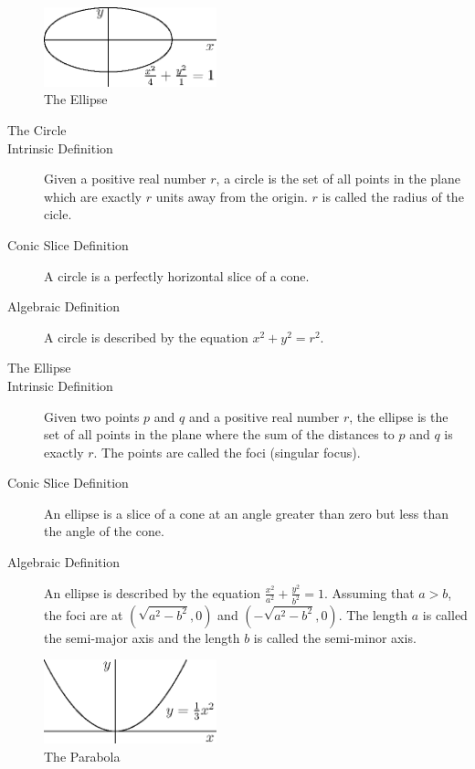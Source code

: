\documentclass[fleqn]{report}
\begin{document}
\begin{figure}[t]
\centering
\includegraphics[width=5cm]{figure06.eps}
\caption{The Ellipse}
\label{figure-ellipse}
\end{figure}

\begin{description}
\item[The Circle]
\item[Intrinsic Definition] Given a positive real number $r$,
a circle is the set of all points in the plane which are
exactly $r$ units away from the origin. $r$ is called the
radius of the cicle.
\item[Conic Slice Definition] A circle is a perfectly
horizontal slice of a cone.
\item[Algebraic Definition] A circle is described by the
equation $x^2 + y^2 = r^2$.
\end{description}

\begin{description}
\item[The Ellipse]
\item[Intrinsic Definition] Given two points $p$ and $q$ and a
positive real number $r$, the ellipse is the set of all points
in the plane where the sum of the distances to $p$ and $q$ is
exactly $r$. The points are called the foci (singular focus). 
\item[Conic Slice Definition] An ellipse is a slice of a cone
at an angle greater than zero but less than the angle of the
cone.
\item[Algebraic Definition] An ellipse is described by the
equation $\frac{x^2}{a^2} + \frac{y^2}{b^2} = 1$. Assuming
that $a>b$, the foci are at $(\sqrt{a^2-b^2},0)$ and
$(-\sqrt{a^2-b^2},0)$. The length $a$ is called the semi-major
axis and the length $b$ is called the semi-minor axis.
\end{description}

\begin{figure}[t]
\centering
\includegraphics[width=5cm]{figure05.eps}
\caption{The Parabola}
\label{figure-parabola}
\end{figure}
\end{document}
